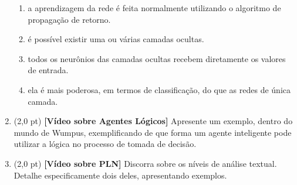 \documentclass[12pt,a4paper,oneside]{article}
\begin{document}
\begin{enumerate}
\begin{enumerate}
\item a aprendizagem da rede é feita normalmente utilizando o algoritmo de propagação de retorno.
\item é possível existir uma ou várias camadas ocultas.
\item todos os neurônios das camadas ocultas recebem diretamente os valores de entrada.
\item ela é mais poderosa, em termos de classificação, do que as redes de única camada.
\end{enumerate}
	
	 \item (2,0 pt) {\bf [Vídeo sobre Agentes Lógicos]} Apresente um exemplo, dentro do mundo de Wumpus, exemplificando de que forma um agente inteligente pode utilizar a lógica no processo de tomada de decisão.
	 
	  \item (2,0 pt) {\bf [Vídeo sobre PLN]} Discorra sobre os níveis de análise textual. Detalhe especificamente dois deles, apresentando exemplos.
	
	
\end{enumerate}
\end{document}
